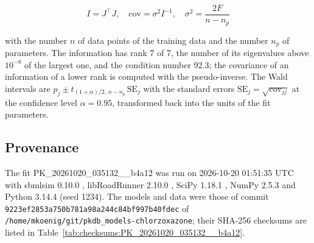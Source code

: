 \begin{equation}
I = J^\top J, \quad \mathrm{cov} = \sigma^2 I^{-1}, \quad \sigma^2 = \frac{2 F}{n - n_p}
\end{equation}

with the number $n$ of data points of the training data and the number $n_p$ of parameters. The information has rank 7 of 7, the number of its eigenvalues above $10^{-8}$ of the largest one, and the condition number 92.3; the covariance of an information of a lower rank is computed with the pseudo-inverse. The Wald intervals are $\hat{p}_j \pm t_{(1+\alpha)/2,\, n-n_p}\, \mathrm{SE}_j$ with the standard errors $\mathrm{SE}_j = \sqrt{\mathrm{cov}_{jj}}$ at the confidence level $\alpha = 0.95$, transformed back into the units of the fit parameters.

\subsection{Provenance}

The fit PK\_20261020\_035132\_\_b4a12 was run on 2026-10-20 01:51:35 UTC with sbmlsim 0.10.0 \cite{Koenig2026_sbmlsim}, libRoadRunner 2.10.0 \cite{Welsh2023}, SciPy 1.18.1 \cite{Virtanen2020}, NumPy 2.5.3 \cite{Harris2020} and Python 3.14.4 (seed 1234). The models and data were those of commit \texttt{9223ef2853a750b781a98a244c84bf997b40fdec} of \texttt{/home/mkoenig/git/pkdb\_models-chlorzoxazone}; their SHA-256 checksums are listed in Table~\ref{tab:checksums:PK_20261020_035132__b4a12}.

